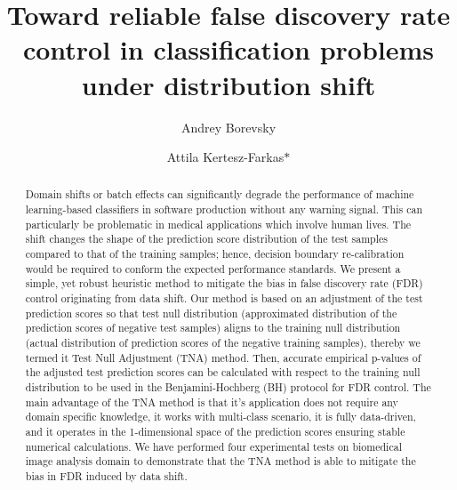 \documentclass{article}
\author{Andrey Borevsky}
\author{Attila Kertesz-Farkas$\ast$}
\affil{Laboratory on AI for Computational Biology, Faculty of Computer Science, HSE University,  11 Pokrovsky Bvld., Moscow 109028, Russian Federation}
\title{Toward reliable false discovery rate control in classification problems under distribution shift}
\begin{document}
\maketitle

\begin{abstract}
	Domain shifts or batch effects can significantly degrade the performance of machine learning-based classifiers in software production without any warning signal. This can particularly be problematic in medical applications which involve human lives. The shift changes the shape of the prediction score distribution of the test samples compared to that of the training samples; hence, decision boundary re-calibration would be required to conform the expected performance standards. We present a simple, yet robust heuristic method to mitigate the bias in false discovery rate (FDR) control originating from data shift. Our method is based on an adjustment of the test prediction scores so that test null distribution (approximated distribution of the prediction scores of negative test samples) aligns to the training null distribution (actual distribution of prediction scores of the negative training samples), thereby we termed it Test Null Adjustment (TNA) method. Then, accurate empirical p-values of the adjusted test prediction scores can be calculated with respect to the training null distribution to be used in the Benjamini-Hochberg (BH) protocol for FDR control. The main advantage of the TNA method is that it's application does not require any domain specific knowledge, it works with multi-class scenario, it is fully data-driven, and it operates in the 1-dimensional space of the prediction scores ensuring stable numerical calculations. We have performed four experimental tests on biomedical image analysis domain to demonstrate that the TNA method is able to mitigate the bias in FDR induced by data shift. 
	
	

\end{abstract}
\end{document}
